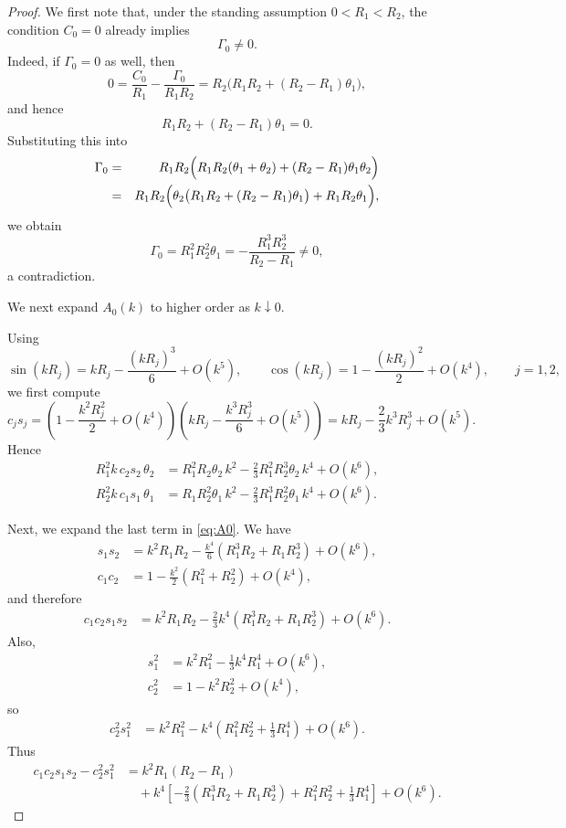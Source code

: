 \documentclass[a4paper,11pt]{article}
\numberwithin{equation}{section}
\theoremstyle{definition}
\theoremstyle{remark}
\begin{document}
\begin{proof}
We first note that, under the standing assumption $0<R_1<R_2$, the condition
$C_0=0$ already implies
\[
\Gamma_0\neq0.
\]
Indeed, if $\Gamma_0=0$ as well, then
\[
0
=
\frac{C_0}{R_1}-\frac{\Gamma_0}{R_1R_2}
=
R_2\bigl(R_1R_2+(R_2-R_1)\theta_1\bigr),
\]
and hence
\[
R_1R_2+(R_2-R_1)\theta_1=0.
\]
Substituting this into
\begin{eqnarray*}
\Gamma_0
&=&
R_1R_2\Bigl(
R_1R_2(\theta_1+\theta_2)+(R_2-R_1)\theta_1\theta_2
\Bigr) \\
&=&
R_1R_2\Bigl(
\theta_2\bigl(R_1R_2+(R_2-R_1)\theta_1\bigr)+R_1R_2\theta_1
\Bigr),
\end{eqnarray*}
we obtain
\[
\Gamma_0=R_1^2R_2^2\theta_1
=
-\frac{R_1^3R_2^3}{R_2-R_1}\neq0,
\]
a contradiction.

We next expand $A_0(k)$ to higher order as $k\downarrow0$.

Using
\[
\sin(kR_j)=kR_j-\frac{(kR_j)^3}{6}+O(k^5),
\qquad
\cos(kR_j)=1-\frac{(kR_j)^2}{2}+O(k^4),
\qquad j=1,2,
\]
we first compute
\[
c_js_j
=
\left(1-\frac{k^2R_j^2}{2}+O(k^4)\right)
\left(kR_j-\frac{k^3R_j^3}{6}+O(k^5)\right)
=
kR_j-\frac{2}{3}k^3R_j^3+O(k^5).
\]
Hence
\begin{align*}
R_1^2k\,c_2s_2\,\theta_2
&=
R_1^2R_2\theta_2\,k^2
-\frac{2}{3}R_1^2R_2^3\theta_2\,k^4
+O(k^6),
\\
R_2^2k\,c_1s_1\,\theta_1
&=
R_1R_2^2\theta_1\,k^2
-\frac{2}{3}R_1^3R_2^2\theta_1\,k^4
+O(k^6).
\end{align*}

Next, we expand the last term in \eqref{eq:A0}. We have
\begin{align*}
s_1s_2
&=
k^2R_1R_2
-\frac{k^4}{6}(R_1^3R_2+R_1R_2^3)
+O(k^6),
\\
c_1c_2
&=
1-\frac{k^2}{2}(R_1^2+R_2^2)+O(k^4),
\end{align*}
and therefore
\begin{align*}
c_1c_2s_1s_2
&=
k^2R_1R_2
-\frac{2}{3}k^4(R_1^3R_2+R_1R_2^3)
+O(k^6).
\end{align*}
Also,
\begin{align*}
s_1^2
&=
k^2R_1^2-\frac{1}{3}k^4R_1^4+O(k^6),
\\
c_2^2
&=
1-k^2R_2^2+O(k^4),
\end{align*}
so
\begin{align*}
c_2^2s_1^2
&=
k^2R_1^2-k^4\left(R_1^2R_2^2+\frac13 R_1^4\right)+O(k^6).
\end{align*}
Thus
\begin{align*}
c_1c_2s_1s_2-c_2^2s_1^2
&=
k^2R_1(R_2-R_1)
\\
&\quad
+
k^4\left[
-\frac23(R_1^3R_2+R_1R_2^3)
+R_1^2R_2^2+\frac13 R_1^4
\right]
+O(k^6).
\end{align*}


\end{proof}
\end{document}
